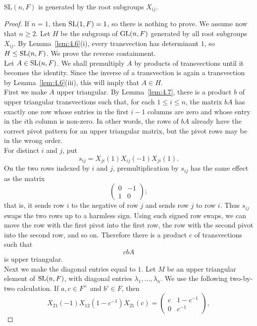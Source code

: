 \documentclass[../Odyssey_Project.tex]{subfiles}
\begin{document}
\begin{proposition}
\label{prop:6.2}
$\mathrm{SL}(n,F)$ is generated by the root subgroups $X_{ij}$.
\end{proposition}
\begin{proof}
If $n=1$, then $\operatorname{SL}(1,F)=1$, so there is nothing to prove. We assume now that $n\geq 2$. Let $H$ be the subgroup of $\operatorname{GL}(n,F)$ generated by all root subgroups $X_{ij}$. By Lemma~\ref{lem:4.6}(i), every transvection has determinant $1$, so $H\leq \operatorname{SL}(n,F)$. We prove the reverse containment.\\
Let $A\in \operatorname{SL}(n,F)$. We shall premultiply $A$ by products of transvections until it becomes the identity. Since the inverse of a transvection is again a transvection by Lemma~\ref{lem:4.6}(iii), this will imply that $A\in H$.\\
First we make $A$ upper triangular. By Lemma~\ref{lem:4.7}, there is a product $b$ of upper triangular transvections such that, for each $1\leq i\leq n$, the matrix $bA$ has exactly one row whose entries in the first $i-1$ columns are zero and whose entry in the $i$th column is non-zero. In other words, the rows of $bA$ already have the correct pivot pattern for an upper triangular matrix, but the pivot rows may be in the wrong order.\\
For distinct $i$ and $j$, put
\[
    s_{ij}=X_{ji}(1)X_{ij}(-1)X_{ji}(1).
\]
On the two rows indexed by $i$ and $j$, premultiplication by $s_{ij}$ has the same effect as the matrix
\[
    \begin{pmatrix}
        0 & -1\\
        1 & 0
    \end{pmatrix};
\]
that is, it sends row $i$ to the negative of row $j$ and sends row $j$ to row $i$. Thus $s_{ij}$ swaps the two rows up to a harmless sign. Using such signed row swaps, we can move the row with the first pivot into the first row, the row with the second pivot into the second row, and so on. Therefore there is a product $c$ of transvections such that
\[
    cbA
\]
is upper triangular.\\
Next we make the diagonal entries equal to $1$. Let $M$ be an upper triangular element of $\operatorname{SL}(n,F)$, with diagonal entries $\lambda_1,\ldots,\lambda_n$. We use the following two-by-two calculation. If $a,c\in F^\times$ and $b'\in F$, then
\[
    X_{21}(-1)X_{12}(1-c^{-1})X_{21}(c)
    =
    \begin{pmatrix}
        c & 1-c^{-1}\\
        0 & c^{-1}
    \end{pmatrix},
\]
\end{proof}
\end{document}
